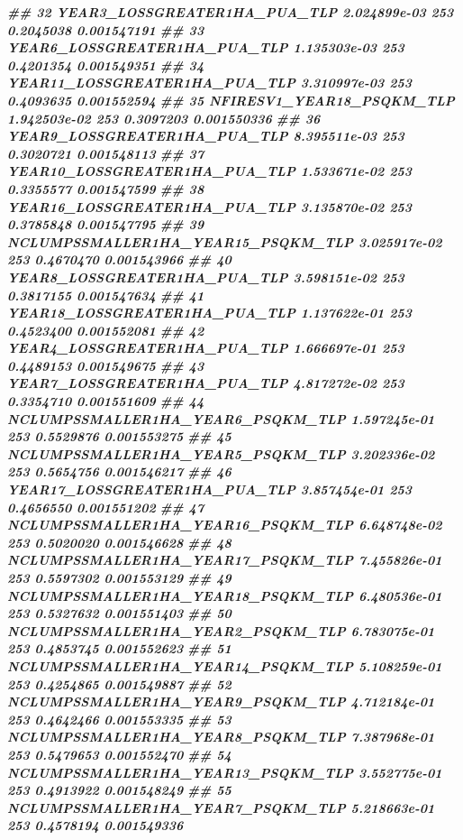 \documentclass[10pt,landscape,a3paper]{article}
\newenvironment{Shaded}{\begin{snugshade}}{\end{snugshade}}
\newcommand{\DocumentationTok}[1]{\textcolor[rgb]{0.56,0.35,0.01}{\textbf{\textit{#1}}}}
\begin{document}
\begin{Shaded}
\begin{Highlighting}[]
\DocumentationTok{\#\# 32       YEAR3\_LOSSGREATER1HA\_PUA\_TLP 2.024899e{-}03    253 0.2045038 0.001547191}
\DocumentationTok{\#\# 33       YEAR6\_LOSSGREATER1HA\_PUA\_TLP 1.135303e{-}03    253 0.4201354 0.001549351}
\DocumentationTok{\#\# 34      YEAR11\_LOSSGREATER1HA\_PUA\_TLP 3.310997e{-}03    253 0.4093635 0.001552594}
\DocumentationTok{\#\# 35          NFIRESV1\_YEAR18\_PSQKM\_TLP 1.942503e{-}02    253 0.3097203 0.001550336}
\DocumentationTok{\#\# 36       YEAR9\_LOSSGREATER1HA\_PUA\_TLP 8.395511e{-}03    253 0.3020721 0.001548113}
\DocumentationTok{\#\# 37      YEAR10\_LOSSGREATER1HA\_PUA\_TLP 1.533671e{-}02    253 0.3355577 0.001547599}
\DocumentationTok{\#\# 38      YEAR16\_LOSSGREATER1HA\_PUA\_TLP 3.135870e{-}02    253 0.3785848 0.001547795}
\DocumentationTok{\#\# 39 NCLUMPSSMALLER1HA\_YEAR15\_PSQKM\_TLP 3.025917e{-}02    253 0.4670470 0.001543966}
\DocumentationTok{\#\# 40       YEAR8\_LOSSGREATER1HA\_PUA\_TLP 3.598151e{-}02    253 0.3817155 0.001547634}
\DocumentationTok{\#\# 41      YEAR18\_LOSSGREATER1HA\_PUA\_TLP 1.137622e{-}01    253 0.4523400 0.001552081}
\DocumentationTok{\#\# 42       YEAR4\_LOSSGREATER1HA\_PUA\_TLP 1.666697e{-}01    253 0.4489153 0.001549675}
\DocumentationTok{\#\# 43       YEAR7\_LOSSGREATER1HA\_PUA\_TLP 4.817272e{-}02    253 0.3354710 0.001551609}
\DocumentationTok{\#\# 44  NCLUMPSSMALLER1HA\_YEAR6\_PSQKM\_TLP 1.597245e{-}01    253 0.5529876 0.001553275}
\DocumentationTok{\#\# 45  NCLUMPSSMALLER1HA\_YEAR5\_PSQKM\_TLP 3.202336e{-}02    253 0.5654756 0.001546217}
\DocumentationTok{\#\# 46      YEAR17\_LOSSGREATER1HA\_PUA\_TLP 3.857454e{-}01    253 0.4656550 0.001551202}
\DocumentationTok{\#\# 47 NCLUMPSSMALLER1HA\_YEAR16\_PSQKM\_TLP 6.648748e{-}02    253 0.5020020 0.001546628}
\DocumentationTok{\#\# 48 NCLUMPSSMALLER1HA\_YEAR17\_PSQKM\_TLP 7.455826e{-}01    253 0.5597302 0.001553129}
\DocumentationTok{\#\# 49 NCLUMPSSMALLER1HA\_YEAR18\_PSQKM\_TLP 6.480536e{-}01    253 0.5327632 0.001551403}
\DocumentationTok{\#\# 50  NCLUMPSSMALLER1HA\_YEAR2\_PSQKM\_TLP 6.783075e{-}01    253 0.4853745 0.001552623}
\DocumentationTok{\#\# 51 NCLUMPSSMALLER1HA\_YEAR14\_PSQKM\_TLP 5.108259e{-}01    253 0.4254865 0.001549887}
\DocumentationTok{\#\# 52  NCLUMPSSMALLER1HA\_YEAR9\_PSQKM\_TLP 4.712184e{-}01    253 0.4642466 0.001553335}
\DocumentationTok{\#\# 53  NCLUMPSSMALLER1HA\_YEAR8\_PSQKM\_TLP 7.387968e{-}01    253 0.5479653 0.001552470}
\DocumentationTok{\#\# 54 NCLUMPSSMALLER1HA\_YEAR13\_PSQKM\_TLP 3.552775e{-}01    253 0.4913922 0.001548249}
\DocumentationTok{\#\# 55  NCLUMPSSMALLER1HA\_YEAR7\_PSQKM\_TLP 5.218663e{-}01    253 0.4578194 0.001549336}

\end{Highlighting}
\end{Shaded}
\end{document}
